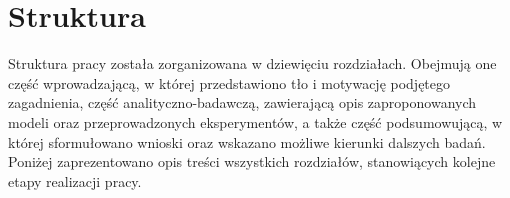 \section{Struktura}

Struktura pracy została zorganizowana w dziewięciu rozdziałach. Obejmują one część wprowadzającą, w której przedstawiono tło i motywację podjętego zagadnienia, część analityczno-badawczą, zawierającą opis zaproponowanych modeli oraz przeprowadzonych eksperymentów, a także część podsumowującą, w której sformułowano wnioski oraz wskazano możliwe kierunki dalszych badań. Poniżej zaprezentowano opis treści wszystkich rozdziałów, stanowiących kolejne etapy realizacji pracy. \\

